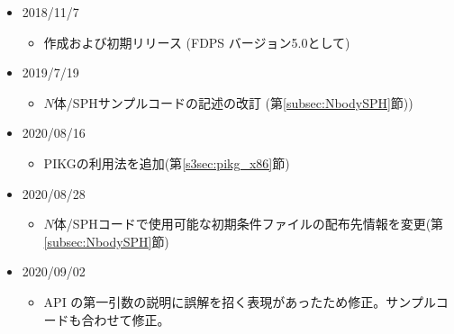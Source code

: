 \begin{itemize}
\item 2018/11/7
  \begin{itemize}
  \item 作成および初期リリース (FDPS バージョン5.0として)
  \end{itemize}
\item 2019/7/19
  \begin{itemize}
  \item $N$体/SPHサンプルコードの記述の改訂 (第\ref{subsec:NbodySPH}節))
  \end{itemize}
\item 2020/08/16
  \begin{itemize}
  \item PIKGの利用法を追加(第\ref{s3sec:pikg_x86}節)
  \end{itemize}
\item 2020/08/28
  \begin{itemize}
  \item $N$体/SPHコードで使用可能な初期条件ファイルの配布先情報を変更(第\ref{subsec:NbodySPH}節)
  \end{itemize}
\item 2020/09/02
  \begin{itemize}
  \item API \initTree の第一引数の説明に誤解を招く表現があったため修正。サンプルコードも合わせて修正。
  \end{itemize}  

\end{itemize}

